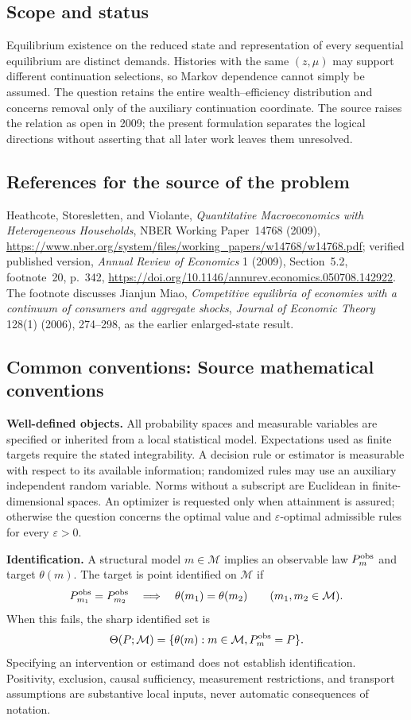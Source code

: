 \documentclass[11pt,a4paper]{article}
\begin{document}
\subsection*{Scope and status}
Equilibrium existence on the reduced state and representation of every sequential equilibrium are distinct demands. Histories with the same $(z,\mu)$ may support different continuation selections, so Markov dependence cannot simply be assumed. The question retains the entire wealth--efficiency distribution and concerns removal only of the auxiliary continuation coordinate. The source raises the relation as open in 2009; the present formulation separates the logical directions without asserting that all later work leaves them unresolved.
\subsection*{References for the source of the problem}
Heathcote, Storesletten, and Violante, \emph{Quantitative Macroeconomics with Heterogeneous Households}, NBER Working Paper~14768 (2009), \url{https://www.nber.org/system/files/working_papers/w14768/w14768.pdf}; verified published version, \emph{Annual Review of Economics} 1 (2009), Section~5.2, footnote~20, p.~342, \url{https://doi.org/10.1146/annurev.economics.050708.142922}. The footnote discusses Jianjun Miao, \emph{Competitive equilibria of economies with a continuum of consumers and aggregate shocks}, \emph{Journal of Economic Theory} 128(1) (2006), 274--298, as the earlier enlarged-state result.

\subsection*{Common conventions: Source mathematical conventions}

\textbf{Well-defined objects.}
All probability spaces and measurable variables are specified or inherited
from a local statistical model. Expectations used as finite targets require
the stated integrability. A decision rule or estimator is measurable with
respect to its available information; randomized rules may use an auxiliary
independent random variable. Norms without a subscript are Euclidean in
finite-dimensional spaces. An optimizer is requested only when attainment
is assured; otherwise the question concerns the optimal value and
$\varepsilon$-optimal admissible rules for every $\varepsilon>0$.

\textbf{Identification.}
A structural model $m\in\mathcal M$ implies an observable law
$P_m^{\rm obs}$ and target $\theta(m)$. The target is point identified on
$\mathcal M$ if
\[
 P_{m_1}^{\rm obs}=P_{m_2}^{\rm obs}
 \quad\Longrightarrow\quad\theta(m_1)=\theta(m_2)
 \qquad(m_1,m_2\in\mathcal M).
\]
When this fails, the sharp identified set is
\[
 \Theta(P;\mathcal M)=\{\theta(m):m\in\mathcal M,
                                  P_m^{\rm obs}=P\}.
\]
Specifying an intervention or estimand does not establish identification.
Positivity, exclusion, causal sufficiency, measurement restrictions, and
transport assumptions are substantive local inputs, never automatic
consequences of notation.
\end{document}
